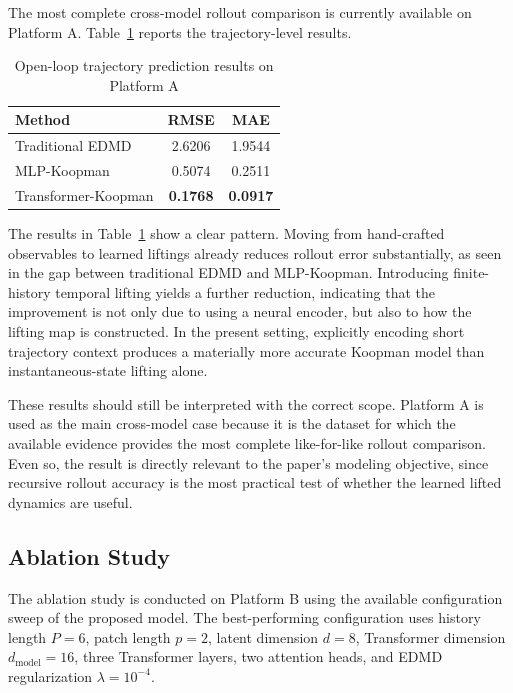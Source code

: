 \documentclass[journal]{IEEEtran}
\begin{document}
The most complete cross-model rollout comparison is currently available on Platform A. Table~\ref{tab:prediction_platform_a} reports the trajectory-level results.

\begin{table}[!t]
\renewcommand{\arraystretch}{1.2}
\caption{Open-loop trajectory prediction results on Platform A}
\label{tab:prediction_platform_a}
\centering
\begin{tabular}{lcc}
\hline\hline
Method & RMSE & MAE \\
\hline
Traditional EDMD & 2.6206 & 1.9544 \\
MLP-Koopman & 0.5074 & 0.2511 \\
Transformer-Koopman & \textbf{0.1768} & \textbf{0.0917} \\
\hline\hline
\end{tabular}
\end{table}

The results in Table~\ref{tab:prediction_platform_a} show a clear pattern. Moving from hand-crafted observables to learned liftings already reduces rollout error substantially, as seen in the gap between traditional EDMD and MLP-Koopman. Introducing finite-history temporal lifting yields a further reduction, indicating that the improvement is not only due to using a neural encoder, but also to how the lifting map is constructed. In the present setting, explicitly encoding short trajectory context produces a materially more accurate Koopman model than instantaneous-state lifting alone.

These results should still be interpreted with the correct scope. Platform A is used as the main cross-model case because it is the dataset for which the available evidence provides the most complete like-for-like rollout comparison. Even so, the result is directly relevant to the paper's modeling objective, since recursive rollout accuracy is the most practical test of whether the learned lifted dynamics are useful.

\subsection{Ablation Study}

The ablation study is conducted on Platform B using the available configuration sweep of the proposed model. The best-performing configuration uses history length $P=6$, patch length $p=2$, latent dimension $d=8$, Transformer dimension $d_{\mathrm{model}}=16$, three Transformer layers, two attention heads, and EDMD regularization $\lambda=10^{-4}$.
\end{document}
